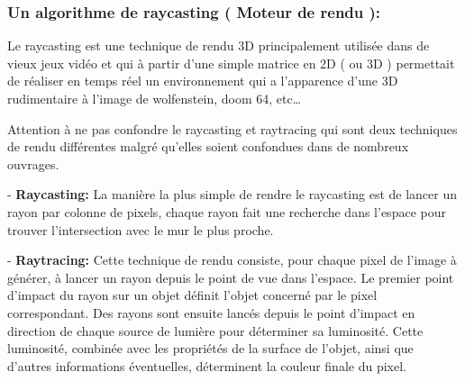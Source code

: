 \documentclass[french, 12pt]{article}
\begin{document}
    \color{black}\begin{flushleft}
        
        \subsubsection{Un algorithme de raycasting ( Moteur de rendu ):}
        \vspace*{1mm}

        Le raycasting est une technique de rendu 3D principalement utilisée dans de vieux jeux vidéo et qui à partir d'une simple matrice en 2D ( ou 3D ) permettait de réaliser en temps réel un environnement qui a l'apparence d'une 3D rudimentaire à l’image de wolfenstein, doom 64, etc…\newline
        \vspace*{1mm}
    
        \color{red}
        Attention à ne pas confondre le raycasting et raytracing qui sont deux techniques de rendu différentes malgré qu’elles soient confondues dans de nombreux ouvrages. \newline
        \vspace*{1mm}

        \color{black}
        \hspace*{6mm} - \textbf{Raycasting:} La manière la plus simple de rendre le raycasting est de lancer un rayon par colonne de pixels, chaque rayon fait une recherche dans l'espace pour trouver l'intersection avec le mur le plus proche. \newline

        \hspace*{6mm} - \textbf{Raytracing:} Cette technique de rendu consiste, pour chaque pixel de l'image à générer, à lancer un rayon depuis le point de vue dans l’espace. Le premier point d'impact du rayon sur un objet définit l'objet concerné par le pixel correspondant. Des rayons sont ensuite lancés depuis le point d'impact en direction de chaque source de lumière pour déterminer sa luminosité. Cette luminosité, combinée avec les propriétés de la surface de l'objet, ainsi que d'autres informations éventuelles, déterminent la couleur finale du pixel. \newline


\end{flushleft}
\end{document}
